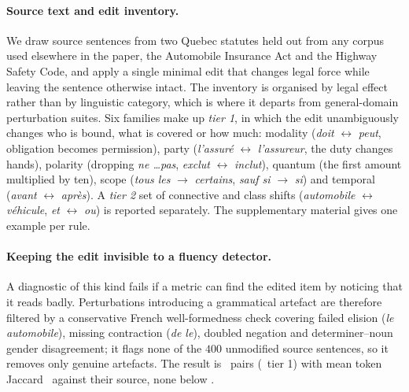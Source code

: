 \documentclass[11pt]{article}
\begin{document}
\paragraph{Source text and edit inventory.}
We draw source sentences from two Quebec statutes held out from any corpus used
elsewhere in the paper, the Automobile Insurance Act and the Highway Safety
Code, and apply a single minimal edit that changes legal force while leaving the
sentence otherwise intact. The inventory is organised by legal effect rather
than by linguistic category, which is where it departs from general-domain
perturbation suites. Six families make up \emph{tier 1}, in which the edit
unambiguously changes who is bound, what is covered or how much: modality
(\emph{doit} $\leftrightarrow$ \emph{peut}, obligation becomes permission),
party (\emph{l'assur\'e} $\leftrightarrow$ \emph{l'assureur}, the duty changes
hands), polarity (dropping \emph{ne \dots pas}, \emph{exclut} $\leftrightarrow$
\emph{inclut}), quantum (the first amount multiplied by ten), scope
(\emph{tous les} $\rightarrow$ \emph{certains}, \emph{sauf si} $\rightarrow$
\emph{si}) and temporal (\emph{avant} $\leftrightarrow$ \emph{apr\`es}). A
\emph{tier 2} set of connective and class shifts (\emph{automobile}
$\leftrightarrow$ \emph{v\'ehicule}, \emph{et} $\leftrightarrow$ \emph{ou}) is
reported separately. The supplementary material gives one example per rule.

\paragraph{Keeping the edit invisible to a fluency detector.}
A diagnostic of this kind fails if a metric can find the edited item by noticing
that it reads badly. Perturbations introducing a grammatical artefact are
therefore filtered by a conservative French well-formedness check covering
failed elision (\emph{le automobile}), missing contraction (\emph{de le}),
doubled negation and determiner--noun gender disagreement; it flags none of the
$400$ unmodified source sentences, so it removes only genuine artefacts. The
result is \numedits\ pairs (\numeditsTierOne\ tier 1) with mean token Jaccard
\meanjaccard\ against their source, none below \minjaccard.
\end{document}
